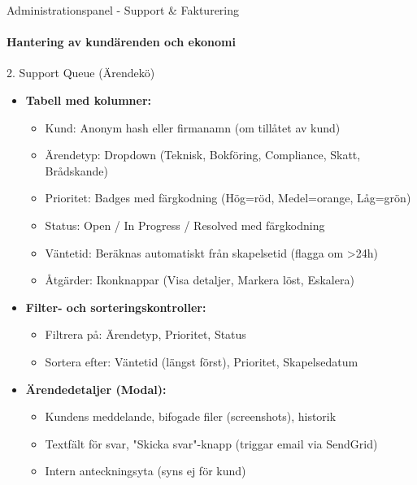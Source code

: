 \documentclass[10pt]{beamer}
\begin{document}
\begin{frame}{Administrationspanel - Support \& Fakturering}
\framesubtitle{Hantering av kundärenden och ekonomi}

\begin{block}{2. Support Queue (Ärendekö)}
  \begin{itemize}
    \item \textbf{Tabell med kolumner:}
      \begin{itemize}
        \item Kund: Anonym hash eller firmanamn (om tillåtet av kund)
        \item Ärendetyp: Dropdown (Teknisk, Bokföring, Compliance, Skatt, Brådskande)
        \item Prioritet: Badges med färgkodning (Hög=röd, Medel=orange, Låg=grön)
        \item Status: Open / In Progress / Resolved med färgkodning
        \item Väntetid: Beräknas automatiskt från skapelsetid (flagga om >24h)
        \item Åtgärder: Ikonknappar (Visa detaljer, Markera löst, Eskalera)
      \end{itemize}
    \item \textbf{Filter- och sorteringskontroller:}
      \begin{itemize}
        \item Filtrera på: Ärendetyp, Prioritet, Status
        \item Sortera efter: Väntetid (längst först), Prioritet, Skapelsedatum
      \end{itemize}
    \item \textbf{Ärendedetaljer (Modal):}
      \begin{itemize}
        \item Kundens meddelande, bifogade filer (screenshots), historik
        \item Textfält för svar, "Skicka svar"-knapp (triggar email via SendGrid)
        \item Intern anteckningsyta (syns ej för kund)
      \end{itemize}
  \end{itemize}
\end{block}


\end{frame}
\end{document}
